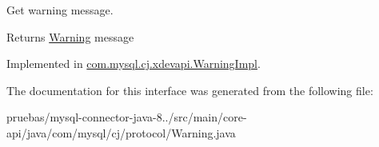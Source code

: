 Get warning message.

\begin{DoxyReturn}{Returns}
\mbox{\hyperlink{interfacecom_1_1mysql_1_1cj_1_1protocol_1_1_warning}{Warning}} message 
\end{DoxyReturn}


Implemented in \mbox{\hyperlink{classcom_1_1mysql_1_1cj_1_1xdevapi_1_1_warning_impl_afeeda25bc13726f35b4198262c46f605}{com.\+mysql.\+cj.\+xdevapi.\+Warning\+Impl}}.



The documentation for this interface was generated from the following file\+:\begin{DoxyCompactItemize}
\item 
pruebas/mysql-\/connector-\/java-\/8../src/main/core-\/api/java/com/mysql/cj/protocol/Warning.\+java\end{DoxyCompactItemize}
